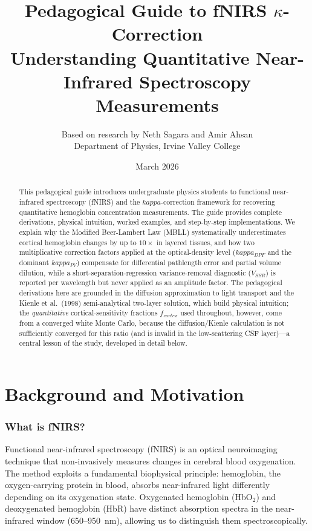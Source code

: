 \documentclass[12pt]{article}
\title{\textbf{Pedagogical Guide to fNIRS $\kappa$-Correction}\\[6pt]
\large Understanding Quantitative Near-Infrared Spectroscopy Measurements}
\author{Based on research by Neth Sagara and Amir Ahsan \\ Department of Physics, Irvine Valley College}
\date{March 2026}
\def\kappa{kappa}%
\def\mathrm#1{#1}%
\begin{document}
\maketitle

\begin{abstract}
This pedagogical guide introduces undergraduate physics students to functional near-infrared spectroscopy (fNIRS) and the $\kappa$-correction framework for recovering quantitative hemoglobin concentration measurements. The guide provides complete derivations, physical intuition, worked examples, and step-by-step implementations. We explain why the Modified Beer-Lambert Law (MBLL) systematically underestimates cortical hemoglobin changes by up to $10\times$ in layered tissues, and how two multiplicative correction factors applied at the optical-density level ($\kappa_{\mathrm{DPF}}$ and the dominant $\kappa_{\mathrm{PV}}$) compensate for differential pathlength error and partial volume dilution, while a short-separation-regression variance-removal diagnostic ($V_{\mathrm{SSR}}$) is reported per wavelength but never applied as an amplitude factor. The pedagogical derivations here are grounded in the diffusion approximation to light transport and the Kienle et al.~(1998) semi-analytical two-layer solution, which build physical intuition; the \emph{quantitative} cortical-sensitivity fractions $f_{\mathrm{cortex}}$ used throughout, however, come from a converged white Monte Carlo, because the diffusion/Kienle calculation is not sufficiently converged for this ratio (and is invalid in the low-scattering CSF layer)---a central lesson of the study, developed in detail below.
\end{abstract}

\newpage
\tableofcontents
\newpage

\part{Background and Motivation}

\section{What is fNIRS?}

Functional near-infrared spectroscopy (fNIRS) is an optical neuroimaging technique that non-invasively measures changes in cerebral blood oxygenation. The method exploits a fundamental biophysical principle: hemoglobin, the oxygen-carrying protein in blood, absorbs near-infrared light differently depending on its oxygenation state. Oxygenated hemoglobin (HbO$_2$) and deoxygenated hemoglobin (HbR) have distinct absorption spectra in the near-infrared window (650--950~nm), allowing us to distinguish them spectroscopically.
\end{document}
